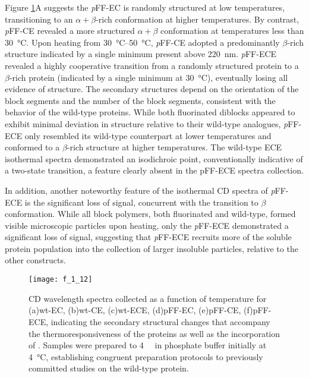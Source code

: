 \begin{refsection}
Figure \ref{fig:CD_temp_wl}A suggests the \emph{p}FF-EC is randomly structured
at low temperatures, transitioning to an ${\alpha+\beta}$-rich conformation  at
higher temperatures. By contrast, \emph{p}FF-CE revealed a more structured
${\alpha+\beta}$ conformation at temperatures less than \SI{30}{\celsius}. Upon
heating from \SIrange{30}{50}{\celsius}, \emph{p}FF-CE adopted a predominantly
${\beta}$-rich structure indicated by a single minimum present above
\SI{220}{\nm}. \emph{p}FF-ECE revealed a highly cooperative transition from a
randomly structured protein to a ${\beta}$-rich protein (indicated by a single
minimum at \SI{30}{\celsius}), eventually losing all evidence of structure. The
secondary structures depend on the orientation of the block segments and the
number of the block segments, consistent with the behavior of the wild-type 
proteins.\cite{Haghpanah2009} While both fluorinated diblocks appeared to
exhibit minimal deviation in structure relative to their wild-type analogues,
\emph{p}FF-ECE only resembled its wild-type counterpart at lower temperatures and
conformed to a ${\beta}$-rich structure at higher temperatures. The wild-type
ECE isothermal spectra demonstrated an isodichroic point, conventionally indicative of a
two-state transition, a feature clearly absent in the pFF-ECE spectra
collection.

In addition, another noteworthy feature of the isothermal CD spectra
of \emph{p}FF-ECE is the significant loss of signal, concurrent with the
transition to ${\beta}$ conformation. While all block polymers, both fluorinated
and wild-type, formed visible microscopic particles upon heating, only the
\emph{p}FF-ECE demonstrated a significant loss of signal, suggesting that
\emph{p}FF-ECE recruits more of the soluble protein population into the
collection of larger insoluble particles, relative to the other constructs.
\begin{figure}[h!] \centering \texttt{[image: f\_1\_12]}
    \caption[CD wavelength spectra collected as a function of temperature for
    (a)wt-EC, (b)wt-CE, (c)wt-ECE, (d)pFF-EC, (e)pFF-CE, (f)pFF-ECE, indicating
the secondary structural changes that accompany the thermoresponsiveness of the
proteins as well as the incorporation of .
]{CD wavelength spectra collected as a function of temperature for
    (a)wt-EC, (b)wt-CE, (c)wt-ECE, (d)pFF-EC, (e)pFF-CE, (f)pFF-ECE, indicating
the secondary structural changes that accompany the thermoresponsiveness of the
proteins as well as the incorporation of .
Samples were prepared to \SI{4}{\micro\moLar} in phosphate buffer initially at
\SI{4}{\celsius}, establishing congruent preparation protocols to previously
committed studies on the wild-type protein.\cite{Haghpanah2009}} \label{fig:CD_temp_wl} \end{figure}


\end{refsection}
